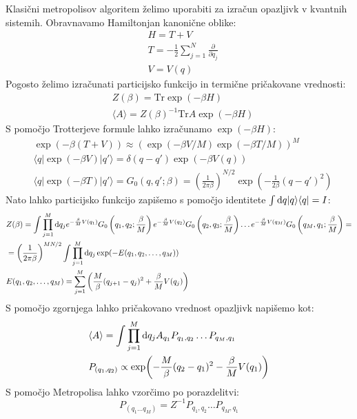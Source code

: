 \documentclass{article}
\begin{document}
Klasični metropolisov algoritem želimo uporabiti za izračun opazljivk v kvantnih sistemih. Obravnavamo Hamiltonjan kanonične oblike:
\begin{align*}
&H=T+V \\
&T = -\frac{1}{2} \sum_{j=1}^N \frac{\partial}{\partial q_j} \\
&V = V(q)
\end{align*}
Pogosto želimo izračunati particijsko funkcijo in termične pričakovane vrednosti:
\begin{align*}
&Z(\beta) = \mathrm{Tr} \exp (- \beta H) \\
&\langle A \rangle = Z(\beta)^{-1} \mathrm{Tr} A \exp(-\beta H)
\end{align*}
S pomočjo Trotterjeve formule lahko izračunamo $\exp(-\beta H)$:
\begin{align*}
&\exp(-\beta(T+V)) \approx \left( \exp(-\beta V / M) \exp(- \beta T/M)\right)^M \\
&\langle q | \exp(-\beta V) |q' \rangle = \delta(q-q') \exp(-\beta V(q)) \\
&\langle q | \exp(-\beta T) |q' \rangle = G_0(q,q';\beta) = \left(\frac{1}{2 \pi \beta}\right)^{N/2} \exp(-\frac{1}{2\beta} (q-q')^2)
\end{align*}
Nato lahko particijsko funkcijo zapišemo s pomočjo identitete $\int \textup{d} q |q \rangle \langle q | = I$:
\begin{align*}
&Z(\beta) = \int \prod_{j=1}^M \textup{d}q_j e^{-\frac{\beta}{M} V(q_1)} G_0 \left(q_1,q_2;\frac{\beta}{M}\right) e^{-\frac{\beta}{M} V(q_2)} G_0 \left(q_2,q_3;\frac{\beta}{M}\right) \dots e^{-\frac{\beta}{M} V(q_M)} G_0 \left(q_M,q_1;\frac{\beta}{M} \right) = \\
&= \left(\frac{1}{2\pi \beta}\right)^{MN/2}  \int \prod_{j=1}^M  \textup{d} q_j \exp (-E(q_1,q_2, \dots, q_M)) \\
&E(q_1,q_2, \dots, q_M) = \sum_{j=1}^M \left( \frac{M}{\beta} (q_{j+1}-q_j)^2 + \frac{\beta}{M} V(q_j)\right)
\end{align*}
S pomočjo zgornjega lahko pričakovano vrednost opazljivk napišemo kot:
\begin{align*}
&\langle A \rangle = \int \prod_{j=1}^M \textup{d}q_j A_{q_1} P_{q_1,q_2} \dots P_{q_M, q_1} \\
&P_{(q_1,q_2)} \propto \exp(-\frac{M}{\beta} (q_2-q_1)^2 - \frac{\beta}{M} V(q_1))
\end{align*}
S pomočjo Metropolisa lahko vzorčimo po porazdelitvi:
\begin{equation*}
P_{(q_1 \dots q_M)} = Z^{-1} P_{q_1,q_2} \dots P_{q_M, q_1}
\end{equation*}
\end{document}
